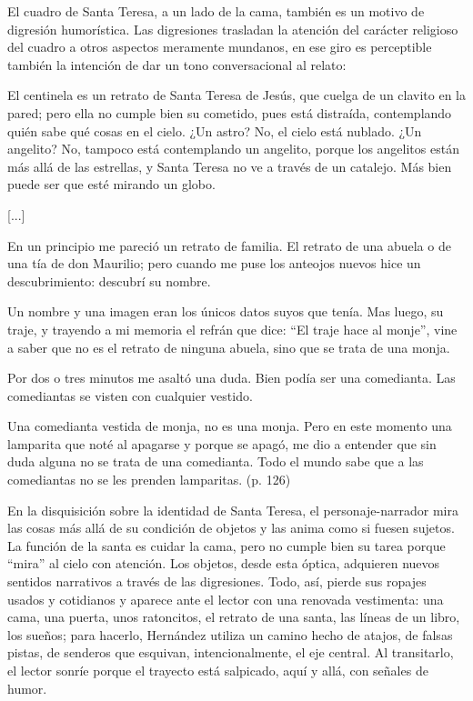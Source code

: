 \documentclass[14pt,twoside,final]{extbook} %
\begin{document}
El cuadro de Santa Teresa, a un lado de la cama, también es un motivo de digresión humorística. Las digresiones trasladan la atención del carácter religioso del cuadro a otros aspectos meramente mundanos, en ese giro es perceptible también la intención de dar un tono conversacional al relato:
\begin{quoting}
El centinela es un retrato de Santa Teresa de Jesús, que cuelga de un clavito en la pared; pero ella no cumple bien su cometido, pues está distraída, contemplando quién sabe qué cosas en el cielo. ¿Un astro? No, el cielo está nublado. ¿Un angelito? No, tampoco está contemplando un angelito, porque los angelitos están más allá de las estrellas, y Santa Teresa no ve a través de un catalejo. Más bien puede ser que esté mirando un globo.

\centerline{[...]}

En un principio me pareció un retrato de familia. El retrato de una abuela o de una tía de don Maurilio; pero cuando me puse los anteojos nuevos hice un descubrimiento: descubrí su nombre.

Un nombre y una imagen eran los únicos datos suyos que tenía. Mas luego, su traje, y trayendo a mi memoria el refrán que dice: ``El traje hace al monje'', vine a saber que no es el retrato de ninguna abuela, sino que se trata de una monja.

Por dos o tres minutos me asaltó una duda. Bien podía ser una comedianta. Las comediantas se visten con cualquier vestido.

Una comedianta vestida de monja, no es una monja. Pero en este momento una lamparita que noté al apagarse y porque se apagó, me dio a entender que sin duda alguna no se trata de una comedianta. Todo el mundo sabe que a las comediantas no se les prenden lamparitas. (p. 126)
\end{quoting}
En la disquisición sobre la identidad de Santa Teresa, el personaje-narrador mira las cosas más allá de su condición de objetos y las anima como si fuesen sujetos. La función de la santa es cuidar la cama, pero no cumple bien su tarea porque ``mira'' al cielo con atención. Los objetos, desde esta óptica, adquieren nuevos sentidos narrativos a través de las digresiones. Todo, así, pierde sus ropajes usados y cotidianos y aparece ante el lector con una renovada vestimenta: una cama, una puerta, unos ratoncitos, el retrato de una santa, las líneas de un libro, los sueños; para hacerlo, Hernández utiliza un camino hecho de atajos, de falsas pistas, de senderos que esquivan, intencionalmente, el eje central. Al transitarlo, el lector sonríe porque el trayecto está salpicado, aquí y allá, con señales de humor.
\end{document}
